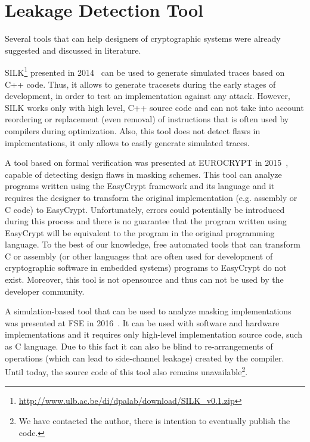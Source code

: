 \section{Leakage Detection Tool}\label{sec:tool}

Several tools that can help designers of cryptographic systems
were already suggested and discussed in literature.

SILK\footnote{\url{http://www.ulb.ac.be/di/dpalab/download/SILK_v0.1.zip}} 
presented in 2014~\cite{DBLP:conf/acsac/Veshchikov14}
can be used to generate simulated traces based on C++ code. Thus, it allows
to generate tracesets during the early stages of development, in order to test an implementation
against any attack. However, SILK works only with high level, C++  source code and 
can not take into account reordering or replacement (even removal) 
of instructions that is often used by compilers during
optimization. Also, this tool does not detect flaws in implementations, 
it only allows to easily generate simulated traces.

A tool based on formal verification 
was presented at EUROCRYPT in 2015~\cite{DBLP:conf/eurocrypt/BartheBDFGS15},
capable of detecting design flaws in masking schemes.
This tool can analyze programs written using the EasyCrypt framework and its language and
it requires the designer to transform the original implementation (e.g. assembly or C code)
to EasyCrypt. Unfortunately, errors could potentially be introduced during this process
and there is no guarantee that the program written using EasyCrypt will be equivalent
to the program in the original programming language. To the best of our knowledge, 
free automated tools that can transform C or assembly 
(or other languages that are often used for development of cryptographic software in embedded systems) 
programs to EasyCrypt do not exist.
Moreover, this tool is not opensource and thus can not be used by the developer community.

A simulation-based tool that can be used to analyze masking implementations
was presented at FSE in 2016~\cite{DBLP:conf/fse/Reparaz16}.
It can be used with software and hardware implementations
and it requires only high-level implementation source code, such as C language.
Due to this fact it can also be blind to re-arrangements of operations 
(which can lead to side-channel leakage) created by the compiler.
Until today, the source code of this tool also remains 
unavailable\footnote{We have contacted the author, there is intention to eventually publish the code.}.

